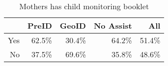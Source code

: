 \begin{table}[ht]
\centering
\begin{tabular}{rrrrr}
  \hline
 & PreID & GeoID & No Assist & All \\ 
  \hline
Yes & 62.5\% & 30.4\% & 64.2\% & 51.4\% \\ 
  No & 37.5\% & 69.6\% & 35.8\% & 48.6\% \\ 
   \hline
\end{tabular}
\caption{Mothers has child monitoring booklet} 
\end{table}

